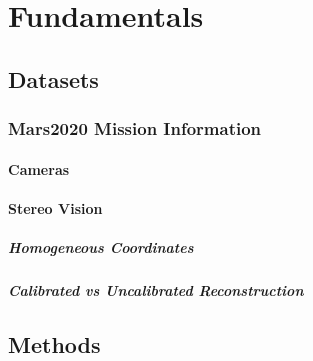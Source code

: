 \chapter{Fundamentals}
\section{Datasets}
\subsection{Mars2020 Mission Information}
\subsubsection{Cameras}

\subsubsection{Stereo Vision}
\paragraph{Homogeneous Coordinates}


\paragraph{Calibrated vs Uncalibrated Reconstruction}


\section{Methods}
